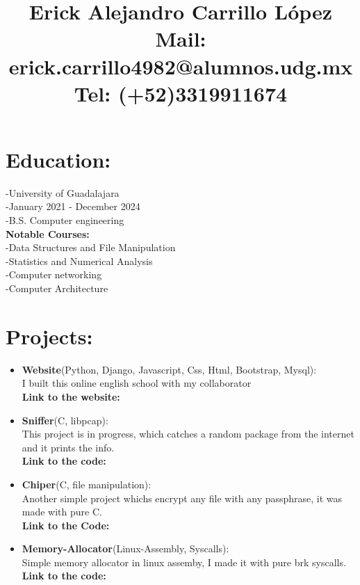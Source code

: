 \documentclass{article}
\title{\textbf{Erick Alejandro Carrillo López} \\
\textbf{Mail:} erick.carrillo4982@alumnos.udg.mx\\
\textbf{Tel:} (+52)3319911674
}
\date{}
\begin{document}
\maketitle

\begin{minipage}[t]{8cm}
\vspace*{-2cm}
\section*{Education:}
-University of Guadalajara\\
-January 2021 - December 2024\\
-B.S. Computer engineering\\
\textbf{Notable Courses:}\\
    -Data Structures and File Manipulation\\
    -Statistics and Numerical Analysis\\
    -Computer networking\\
    -Computer Architecture
\section*{Projects:}
\begin{itemize}
\item \textbf{Website}(Python, Django, Javascript, Css, Html, Bootstrap, Mysql):\\
  I built this online english school with my collaborator \href{https://github.com/oscara1796}{\color{blue}{oscara1796}}\\
  \textbf{Link to the website:} \href{https://ilearn-demo.herokuapp.com/}{\color{Blue}{WebSite}}
\item \textbf{Sniffer}(C, libpcap):\\
  This project is in progress, which catches a random package from the internet and it prints the info.\\
  \textbf{Link to the code:} \href{https://github.com/alecksandr26/sniffer}{\color{Blue}{GitHub}}
\item \textbf{Chiper}(C, file manipulation): \\
  Another simple project whichs encrypt any file with any passphrase, it was made with pure C.\\
  \textbf{Link to the Code:} \href{https://github.com/alecksandr26/cipher}{\color{Blue}{GitHub}}
\item \textbf{Memory-Allocator}(Linux-Assembly, Syscalls):\\
  Simple memory allocator in linux assemby, I made it with pure brk syscalls.\\
  \textbf{Link to the code:} \href{https://github.com/alecksandr26/Memory-Allocator-In-Nasm}{\color{Blue}{GitHub}}
        

\end{itemize}
\end{minipage}
\end{document}
